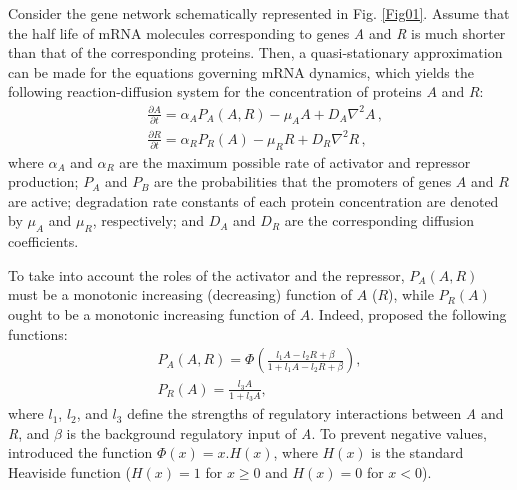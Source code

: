 \documentclass[%
 preprint,
 amsmath,amssymb,
 aps,
]{revtex4-2}
\begin{document}
	Consider the gene network schematically represented in Fig. \ref{Fig01}. Assume
	that the half life of mRNA molecules corresponding to genes \textit{A} and
	\textit{R} is much shorter than that of the corresponding proteins. Then, a
	quasi-stationary approximation can be made for the equations governing mRNA
	dynamics, which yields the following reaction-diffusion system for the concentration of
	proteins $A$ and $R$:
	\begin{subequations}\label{eq012}
		\begin{flalign}
		& \frac{\partial A}{\partial t} = \alpha_A P_A (A, R) - \mu_A A + D_A \nabla^2 A\,,
		\label{eq01} \\
		& \frac{\partial R}{\partial t} = \alpha_R P_R (A) - \mu_R R + D_R \nabla^2 R\,,
		\label{eq02}
		\end{flalign}
	\end{subequations}
	where $\alpha_A$ and $\alpha_R$ are the maximum possible rate of activator and
	repressor production; $P_A$ and $P_B$ are the probabilities that the promoters
	of genes $A$ and $R$ are active; degradation rate constants of each protein
	concentration are denoted by $\mu_A$ and $\mu_R$, respectively; and $D_A$ and
	$D_R$ are the corresponding diffusion coefficients.
	
	To take into account the roles of the activator and the repressor, $P_A(A, R)$
	must be a monotonic increasing (decreasing) function of $A$ ($R$), while
	$P_R(A)$ ought to be a monotonic increasing function of $A$. Indeed,
	\citet{Cotterell2015} proposed the following functions:
	\begin{subequations}\label{eq034}
		\begin{gather}
		P_A(A, R) = \displaystyle \Phi \left(
		\frac{l_1 A - l_2 R + \beta}{1 + l_1 A - l_2 R + \beta}
		\right), \label{eq03} \\[3mm]
		P_R(A) = \displaystyle \frac{l_3 A}{1 + l_3 A}, \label{eq04}
		\end{gather}
	\end{subequations}
	where $l_1$, $l_2$, and $l_3$ define the strengths of regulatory interactions
	between \textit{A} and \textit{R}, and $\beta$ is the background regulatory
	input of \textit{A}. To prevent negative values, \citeauthor{Cotterell2015}
	introduced the function $\Phi(x) = x.H(x)$, where $H(x)$ is the standard
	Heaviside function ($H(x) = 1$ for $x \geq 0$ and $H(x) = 0$ for $x < 0$).
	
\end{document}
